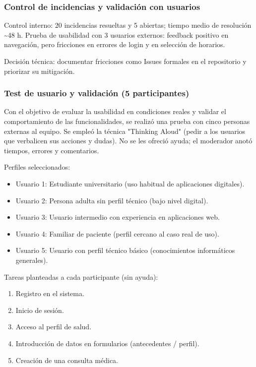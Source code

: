 \documentclass[a4paper,11pt]{article}
\begin{document}
\subsubsection*{Control de incidencias y validación con usuarios}

Control interno: 20 incidencias resueltas y 5 abiertas; tiempo medio de resolución \textasciitilde48 h. Prueba de usabilidad con 3 usuarios externos: feedback positivo en navegación, pero fricciones en errores de login y en selección de horarios.

Decisión técnica: documentar fricciones como Issues formales en el repositorio y priorizar su mitigación.

\subsubsection*{Test de usuario y validación (5 participantes)}

Con el objetivo de evaluar la usabilidad en condiciones reales y validar el comportamiento de las funcionalidades, se realizó una prueba con cinco personas externas al equipo. Se empleó la técnica "Thinking Aloud" (pedir a los usuarios que verbalicen sus acciones y dudas). No se les ofreció ayuda; el moderador anotó tiempos, errores y comentarios.

Perfiles seleccionados:
\begin{itemize}
	\item Usuario 1: Estudiante universitario (uso habitual de aplicaciones digitales).
	\item Usuario 2: Persona adulta sin perfil técnico (bajo nivel digital).
	\item Usuario 3: Usuario intermedio con experiencia en aplicaciones web.
	\item Usuario 4: Familiar de paciente (perfil cercano al caso real de uso).
	\item Usuario 5: Usuario con perfil técnico básico (conocimientos informáticos generales).
\end{itemize}

Tareas planteadas a cada participante (sin ayuda):
\begin{enumerate}
	\item Registro en el sistema.
	\item Inicio de sesión.
	\item Acceso al perfil de salud.
	\item Introducción de datos en formularios (antecedentes / perfil).
	\item Creación de una consulta médica.
\end{enumerate}
\end{document}
